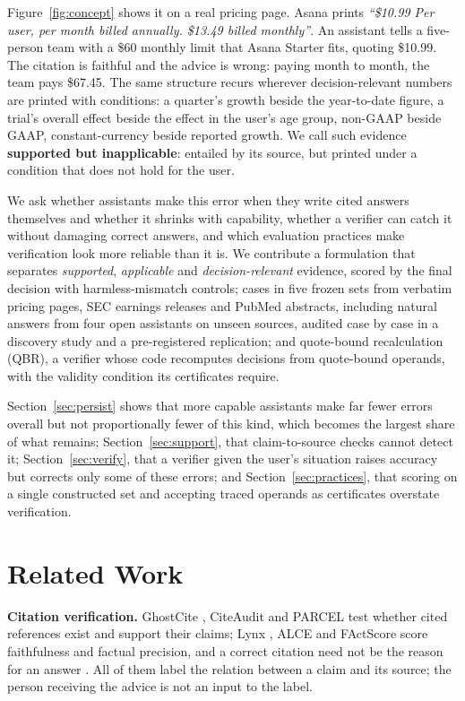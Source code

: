 \documentclass[11pt,letterpaper]{article}
\begin{document}
Figure~\ref{fig:concept} shows it on a real pricing page. Asana prints \emph{``\$10.99 Per user, per month billed annually. \$13.49 billed monthly''}. An assistant tells a five-person team with a \$60 monthly limit that Asana Starter fits, quoting \$10.99. The citation is faithful and the advice is wrong: paying month to month, the team pays \$67.45. The same structure recurs wherever decision-relevant numbers are printed with conditions: a quarter's growth beside the year-to-date figure, a trial's overall effect beside the effect in the user's age group, non-GAAP beside GAAP, constant-currency beside reported growth. We call such evidence \textbf{supported but inapplicable}: entailed by its source, but printed under a condition that does not hold for the user.

We ask whether assistants make this error when they write cited answers themselves and whether it shrinks with capability, whether a verifier can catch it without damaging correct answers, and which evaluation practices make verification look more reliable than it is. We contribute a formulation that separates \emph{supported}, \emph{applicable} and \emph{decision-relevant} evidence, scored by the final decision with harmless-mismatch controls; \NCasesAllNat{} cases in five frozen sets from verbatim pricing pages, SEC earnings releases and PubMed abstracts, including natural answers from four open assistants on unseen sources, audited case by case in a discovery study and a pre-registered replication; and quote-bound recalculation (QBR), a verifier whose code recomputes decisions from quote-bound operands, with the validity condition its certificates require.

Section~\ref{sec:persist} shows that more capable assistants make far fewer errors overall but not proportionally fewer of this kind, which becomes the largest share of what remains; Section~\ref{sec:support}, that claim-to-source checks cannot detect it; Section~\ref{sec:verify}, that a verifier given the user's situation raises accuracy but corrects only some of these errors; and Section~\ref{sec:practices}, that scoring on a single constructed set and accepting traced operands as certificates overstate verification.

\section{Related Work}
\label{sec:related}
\textbf{Citation verification.} GhostCite \citep{ghostcite}, CiteAudit \citep{citeaudit} and PARCEL \citep{parcel} test whether cited references exist and support their claims; Lynx \citep{lynx_paper}, ALCE \citep{alce} and FActScore \citep{factscore} score faithfulness and factual precision, and a correct citation need not be the reason for an answer \citep{correct_not_faithful}. All of them label the relation between a claim and its source; the person receiving the advice is not an input to the label.
\end{document}
